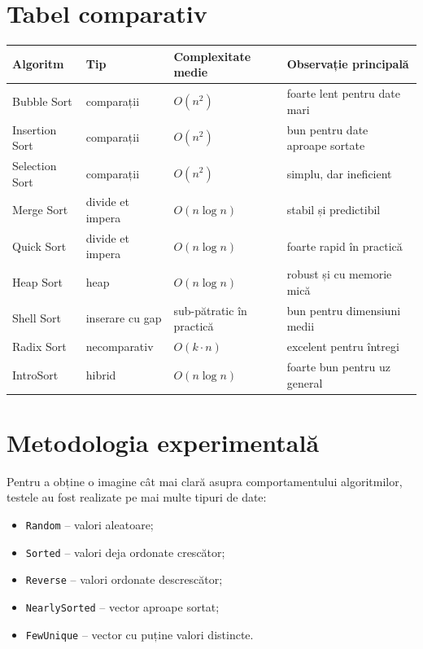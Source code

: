 \documentclass[12pt,a4paper]{article}
\begin{document}
\section{Tabel comparativ}

\begin{longtable}{>{\raggedright\arraybackslash}p{3cm} >{\raggedright\arraybackslash}p{3cm} >{\raggedright\arraybackslash}p{3cm} >{\raggedright\arraybackslash}p{4cm}}
\toprule
Algoritm & Tip & Complexitate medie & Observație principală \\
\midrule
Bubble Sort & comparații & $O(n^2)$ & foarte lent pentru date mari \\
Insertion Sort & comparații & $O(n^2)$ & bun pentru date aproape sortate \\
Selection Sort & comparații & $O(n^2)$ & simplu, dar ineficient \\
Merge Sort & divide et impera & $O(n \log n)$ & stabil și predictibil \\
Quick Sort & divide et impera & $O(n \log n)$ & foarte rapid în practică \\
Heap Sort & heap & $O(n \log n)$ & robust și cu memorie mică \\
Shell Sort & inserare cu gap & sub-pătratic în practică & bun pentru dimensiuni medii \\
Radix Sort & necomparativ & $O(k \cdot n)$ & excelent pentru întregi \\
IntroSort & hibrid & $O(n \log n)$ & foarte bun pentru uz general \\
\bottomrule
\end{longtable}

\section{Metodologia experimentală}

Pentru a obține o imagine cât mai clară asupra comportamentului algoritmilor, testele au fost realizate pe mai multe tipuri de date:

\begin{itemize}
    \item \texttt{Random} -- valori aleatoare;
    \item \texttt{Sorted} -- valori deja ordonate crescător;
    \item \texttt{Reverse} -- valori ordonate descrescător;
    \item \texttt{NearlySorted} -- vector aproape sortat;
    \item \texttt{FewUnique} -- vector cu puține valori distincte.
\end{itemize}
\end{document}
